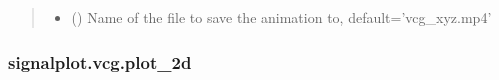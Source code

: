 \documentclass[letterpaper,10pt,english]{sphinxmanual}
\begin{document}
\begin{fulllineitems}
\begin{quote}
\begin{description}
\begin{itemize}
\item {} 
\sphinxAtStartPar
{} (\sphinxstyleliteralemphasis{\sphinxupquote{, }}) \textendash{} Name of the file to save the animation to, default=’vcg\_xyz.mp4’

\end{itemize}

\end{description}\end{quote}

\end{fulllineitems}



\subsubsection{signalplot.vcg.plot\_2d}
\label{\detokenize{_autosummary/signalplot.vcg.plot_2d:signalplot-vcg-plot-2d}}\label{\detokenize{_autosummary/signalplot.vcg.plot_2d::doc}}
\end{document}
